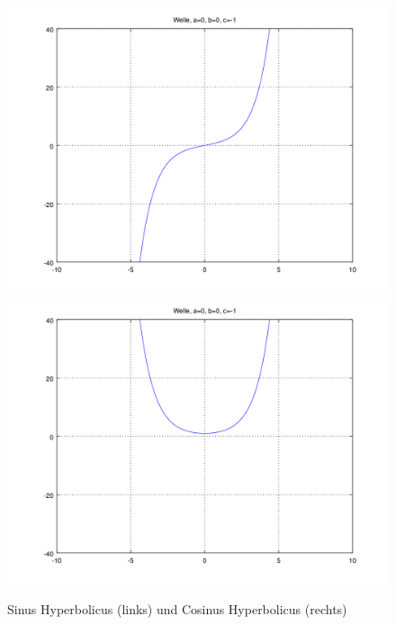\begin{figure}
	\includegraphics[scale=0.35]{./wellen/images/basicfunctions/sinh.png}
	\includegraphics[scale=0.35]{./wellen/images/basicfunctions/cosh.png}
	\caption{Sinus Hyperbolicus (links) und Cosinus Hyperbolicus (rechts)}
	\label{fig:wellen:sinh-cosh}
\end{figure}